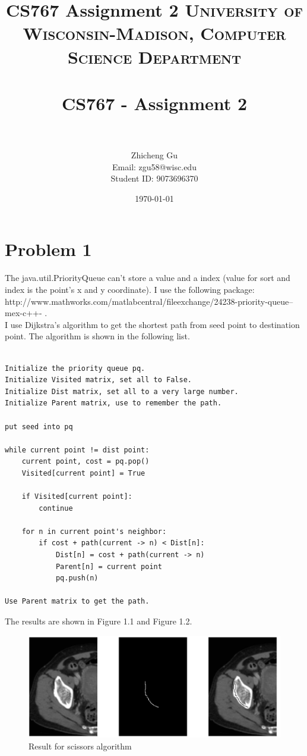 \documentclass[paper=a4, fontsize=11pt]{scrartcl} %
\title{CS767 Assignment 2}
\title{	
\normalfont \normalsize 
\textsc{University of Wisconsin-Madison, Computer Science Department} \\ [25pt] %
\horrule{0.5pt} \\[0.4cm] %
\huge CS767 - Assignment 2 \\ %
\horrule{2pt} \\[0.5cm] %
}
\author{Zhicheng Gu \\ Email: zgu58@wisc.edu \\ Student ID: 9073696370} %
\date{\normalsize\today} %
\numberwithin{equation}{section} %
\numberwithin{figure}{section} %
\numberwithin{table}{subsection} %
\begin{document}
\maketitle %

\renewcommand\thesubsection{\arabic{subsection}}

\section{Problem 1}

The java.util.PriorityQueue can't store a value and a index (value for sort and index is the point's x and y coordinate).
I use the following package: http://www.mathworks.com/matlabcentral/fileexchange/24238-priority-queue--mex-c++- .
\\

I use Dijkstra's algorithm to get the shortest path from seed point to destination point.
The algorithm is shown in the following list.

\begin{lstlisting}[]

Initialize the priority queue pq.
Initialize Visited matrix, set all to False.
Initialize Dist matrix, set all to a very large number.
Initialize Parent matrix, use to remember the path.

put seed into pq

while current point != dist point:
	current point, cost = pq.pop()
	Visited[current point] = True
	
	if Visited[current point]:
		continue
	
	for n in current point's neighbor:
		if cost + path(current -> n) < Dist[n]:
			Dist[n] = cost + path(current -> n)
			Parent[n] = current point
			pq.push(n)
			
Use Parent matrix to get the path.

\end{lstlisting}

The results are shown in Figure 1.1 and Figure 1.2.
\newpage

\begin{figure}[!htbp]
	\centering
	\includegraphics[width = 16cm]{p1_1.jpg}
	\caption{Result for scissors algorithm}
\end{figure}
\end{document}
